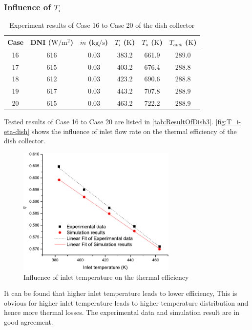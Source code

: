 \subsubsection{Influence of $T_i$}

\begin{table}[htbp]
	\caption{Experiment results of Case 16 to Case 20 of the dish collector}
	\centering
	\begin{tabular}{cccccc}
		\toprule
		Case	& DNI ($\mathrm{W/m^2}$)	&	$\dot{m}$ ($\mathrm{kg/s}$)			&	$T_i$ ($\mathrm{K}$)	&	$T_o$ ($\mathrm{K}$)		&	$T_{amb}$ ($\mathrm{K}$)\\
		\midrule
		16	&	616	&	0.03	&	383.2	&	661.9	&	289.0\\
		17	&	615	&	0.03	&	403.2	&	676.4	&	288.8\\
		18	&	612	&	0.03	&	423.2	&	690.6	&	288.8	\\
		19	&	617	&	0.03	&	443.2	&	707.8	&	288.9\\
		20	&	615	&	0.03	&	463.2	&	722.2	&	288.9\\
		\bottomrule
	\end{tabular}
	
	\label{tab:ResultOfDish3}
\end{table}
Tested results of Case 16 to Case 20 are listed in \autoref{tab:ResultOfDish3}.
\autoref{fig:T_i-eta-dish} shows the influence of inlet flow rate on the thermal efficiency of the dish collector.
\begin{figure}[!ht]
\centering
\includegraphics[width=0.7\textwidth]{fig/T_i-eta-dish}
\caption{Influence of inlet temperature on the thermal efficiency}
\label{fig:T_i-eta-dish}
\end{figure}

It can be found that higher inlet temperature leads to lower efficiency, This is obvious for higher inlet temperature leads to higher temperature distribution and hence more thermal losses. The experimental data and simulation result are in good agreement.

